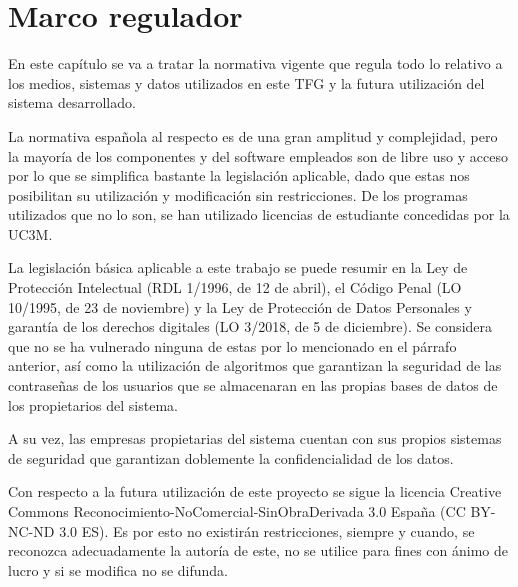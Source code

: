 \chapter{Marco regulador}\label{ch:marco}
En este capítulo se va a tratar la normativa vigente que regula todo lo relativo a los medios, sistemas y datos utilizados en este TFG y la futura utilización del sistema desarrollado.

La normativa española al respecto es de una gran amplitud y complejidad, pero la mayoría de los componentes y del software empleados son de libre uso y acceso por lo que se simplifica bastante la legislación aplicable, dado que estas nos posibilitan su utilización y modificación sin restricciones. De los programas utilizados que no lo son, se han utilizado licencias de estudiante concedidas por la UC3M\@.

La legislación básica aplicable a este trabajo se puede resumir en la Ley de Protección Intelectual (RDL 1/1996, de 12 de abril), el Código Penal (LO 10/1995, de 23 de noviembre) y la Ley de Protección de Datos Personales y garantía de los derechos digitales (LO 3/2018, de 5 de diciembre). Se considera que no se ha vulnerado ninguna de estas por lo mencionado en el párrafo anterior, así como la utilización de algoritmos que garantizan la seguridad de las contraseñas de los usuarios que se almacenaran en las propias bases de datos de los propietarios del sistema.

A su vez, las empresas propietarias del sistema cuentan con sus propios sistemas de seguridad que garantizan doblemente la confidencialidad de los datos.

Con respecto a la futura utilización de este proyecto se sigue la licencia Creative Commons Reconocimiento-NoComercial-SinObraDerivada 3.0 España (CC BY-NC-ND 3.0 ES). Es por esto no existirán restricciones, siempre y cuando, se reconozca adecuadamente la autoría de este, no se utilice para fines con ánimo de lucro y si se modifica no se difunda.